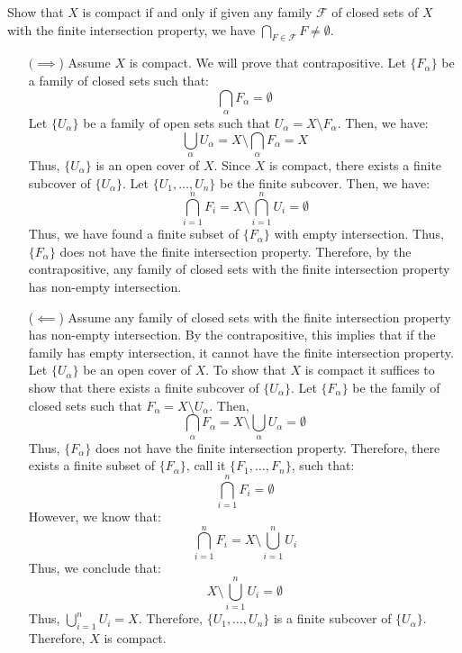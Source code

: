 \documentclass[12pt]{article}
\begin{document}


\begin{problab}{1}
    Show that $X$ is compact if and only if given any family $\mathcal{F}$ of closed sets of $X$ with the finite intersection property, we have $\bigcap_{F \in \mathcal{F}} F \neq \emptyset$.
\end{problab}
\begin{solu}
    \bbni
    \begin{itemize}
        \item[$(\implies$)] Assume $X$ is compact. We will prove that contrapositive. Let $\{F_\alpha\}$ be a family of closed sets such that: 
        \[ \bigcap_{\alpha} F_\alpha = \emptyset \]
        Let $\{U_\alpha\}$ be a family of open sets such that $U_\alpha = X \setminus F_\alpha$. Then, we have:
        \[ \bigcup_\alpha U_\alpha = X \setminus \bigcap_\alpha F_\alpha = X\]
        Thus, $\{U_\alpha\}$ is an open cover of $X$. Since $X$ is compact, there exists a finite subcover of $\{U_\alpha\}$. Let $\{U_1, \ldots, U_n\}$ be the finite subcover. Then, we have:
        \[ \bigcap_{i=1}^n F_i = X \setminus \bigcap_{i=1}^n U_i = \emptyset\]
        Thus, we have found a finite subset of $\{F_\alpha\}$ with empty intersection. Thus, $\{F_\alpha\}$ does not have the finite intersection property. Therefore, by the contrapositive, any family of closed sets with the finite intersection property has non-empty intersection.
        \item[($\impliedby$)] Assume any family of closed sets with the finite intersection property has non-empty intersection. By the contrapositive, this implies that if the family has empty intersection, it cannot have the finite intersection property. \bbni 
        Let $\{U_\alpha\}$ be an open cover of $X$. To show that $X$ is compact it suffices to show that there exists a finite subcover of $\{U_\alpha\}$. Let $\{F_\alpha\}$ be the family of closed sets such that $F_\alpha = X \setminus U_\alpha$. Then, 
        \[ \bigcap_{\alpha} F_\alpha = X \setminus \bigcup_\alpha U_\alpha  = \emptyset \]
        Thus, $\{F_\alpha\}$ does not have the finite intersection property. Therefore, there exists a finite subset of $\{F_\alpha\}$, call it $\{F_1, \ldots, F_n\}$, such that: 
        \[ \bigcap_{i = 1}^n F_i = \emptyset \]
        However, we know that:
        \[ \bigcap_{i = 1}^n F_i = X \setminus \bigcup_{i=1}^n U_i \]
        Thus, we conclude that:
        \[X \setminus \bigcup_{i=1}^n U_i = \emptyset\]
        Thus, $\bigcup_{i=1}^n U_i = X$. Therefore, $\{U_1, \ldots, U_n\}$ is a finite subcover of $\{U_\alpha\}$. Therefore, $X$ is compact.
    \end{itemize}
\end{solu}
\end{document}
